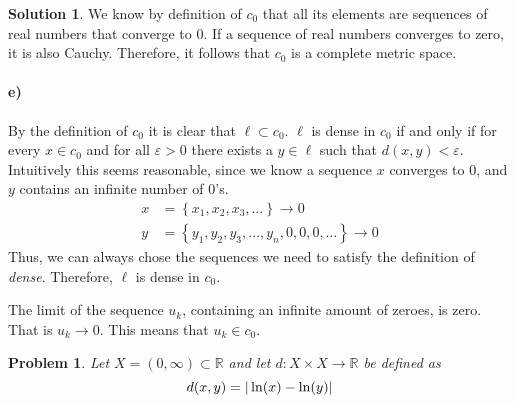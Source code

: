 \documentclass[a4paper]{article}
\newtheorem{prb}{Problem}
\theoremstyle{definition}
\newtheorem{sol}{Solution}
\begin{document}
\begin{sol}
We know by definition of $c_0$ that all its elements are sequences of real
numbers that converge to $0$.  If a sequence of real numbers converges to zero,
it is also Cauchy. Therefore, it follows that $c_0$ is a complete metric space.

\paragraph{e)}

By the definition of $c_0$ it is clear that $\ell \subset c_0$.  $\ell$ is
dense in $c_0$ if and only if for every $x \in c_0$ and for all $\varepsilon >
0$ there exists a $y \in \ell$ such that $d(x, y) < \varepsilon$.  Intuitively
this seems reasonable, since we know a sequence $x$ converges to $0$, and $y$
contains an infinite number of $0$'s.
\begin{align*}
x &= \left\{ x_1, x_2, x_3, \ldots \right\} \longrightarrow 0\\
y &= \left\{ y_1, y_2, y_3, \ldots, y_n, 0, 0, 0, \ldots \right\} \longrightarrow 0
\end{align*}
Thus, we can always chose the sequences we need to satisfy the definition of
\textit{dense}.  Therefore, $\ell$ is dense in $c_0$.

The limit of the sequence $u_k$, containing an infinite amount of zeroes, is
zero.  That is $u_k \longrightarrow 0$. This means that $u_k \in c_0$.
\end{sol}

\begin{prb}
  Let $X = \left( 0, \infty \right) \subset \mathbb{R}$ and let $d : X \times X \longrightarrow \mathbb{R}$ be defined as
  \begin{equation}
    \notag
    d(x, y) = | \ln(x) - \ln(y)|
  \end{equation}
\end{prb}
\end{document}

